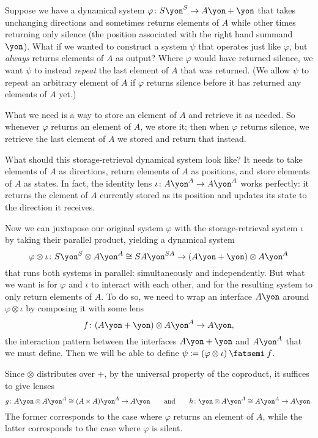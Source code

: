 \documentclass[Book-Poly]{subfiles}
\begin{document}
\begin{example}[Repeater]
Suppose we have a dynamical system $\varphi\colon S\yon^S\to A\yon+\yon$ that takes unchanging directions and sometimes returns elements of $A$ while other times returning only silence (the position associated with the right hand summand $\yon$).
What if we wanted to construct a system $\psi$ that operates just like $\varphi$, but \emph{always} returns elements of $A$ as output?
Where $\varphi$ would have returned silence, we want $\psi$ to instead \emph{repeat} the last element of $A$ that was returned. (We allow $\psi$ to repeat an arbitrary element of $A$ if $\varphi$ returns silence before it has returned any elements of $A$ yet.)

What we need is a way to store an element of $A$ and retrieve it as needed.
So whenever $\varphi$ returns an element of $A$, we store it; then when $\varphi$ returns silence, we retrieve the last element of $A$ we stored and return that instead.

What should this storage-retrieval dynamical system look like?
It needs to take elements of $A$ as directions, return elements of $A$ as positions, and store elements of $A$ as states.
In fact, the identity lens $\iota\colon A\yon^A\to A\yon^A$ works perfectly: it returns the element of $A$ currently stored as its position and updates its state to the direction it receives.

Now we can juxtapose our original system $\varphi$ with the storage-retrieval system $\iota$ by taking their parallel product, yielding a dynamical system
\[
    \varphi\otimes\iota\colon S\yon^S\otimes A\yon^A\iso SA\yon^{SA}\to (A\yon+\yon)\otimes A\yon^A
\]
that runs both systems in parallel: simultaneously and independently.
But what we want is for $\varphi$ and $\iota$ to interact with each other, and for the resulting system to only return elements of $A$.
To do so, we need to wrap an interface $A\yon$ around $\varphi\otimes\iota$ by composing it with some lens
\[
    f\colon(A\yon+\yon)\otimes A\yon^A\to A\yon,
\]
the interaction pattern between the interfaces $A\yon+\yon$ and $A\yon^A$ that we must define.
Then we will be able to define $\psi\coloneqq(\varphi\otimes\iota)\then f$.

Since $\otimes$ distributes over $+$, by the universal property of the coproduct, it suffices to give lenses
\[
    g\colon A\yon\otimes A\yon^A\iso (A\times A)\yon^A\to A\yon \qqand h\colon\yon\otimes A\yon^A\iso A\yon^A\to A\yon.
\]
The former corresponds to the case where $\varphi$ returns an element of $A$, while the latter corresponds to the case where $\varphi$ is silent.


\end{example}
\end{document}
